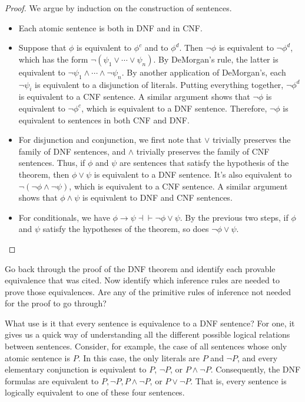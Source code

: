 \begin{proof} We argue by induction on the construction of sentences.
\begin{itemize}
\item Each atomic sentence is both in DNF and in CNF.
\item Suppose that $\phi$ is equivalent to $\phi ^c$ and to $\phi ^d$.
  Then $\neg \phi$ is equivalent to $\neg \phi ^d$, which has the form
  $\neg (\psi _1\vee\cdots\vee\psi _n)$.  By DeMorgan's rule, the
  latter is equivalent to
  $\neg \psi _1\wedge \cdots \wedge\neg \psi _n$.  By another
  application of DeMorgan's, each $\neg \psi _i$ is equivalent to a
  disjunction of literals.  Putting everything together,
  $\neg \phi ^d$ is equivalent to a CNF sentence.  A similar argument
  shows that $\neg \phi$ is equivalent to $\neg \phi ^c$, which is
  equivalent to a DNF sentence.  Therefore, $\neg \phi$ is equivalent
  to sentences in both CNF and DNF.
\item For disjunction and conjunction, we first note that $\vee$
  trivially preserves the family of DNF sentences, and $\wedge$
  trivially preserves the family of CNF sentences.  Thus, if $\phi$
  and $\psi$ are sentences that satisfy the hypothesis of the theorem,
  then $\phi\vee\psi$ is equivalent to a DNF sentence.  It's also
  equivalent to $\neg (\neg \phi\wedge\neg\psi )$, which is equivalent
  to a CNF sentence.  A similar argument shows that $\phi\wedge\psi$
  is equivalent to DNF and CNF sentences.
\item For conditionals, we have
  $\phi\to\psi\dashv\vdash\neg \phi\vee\psi$.  By the previous two
  steps, if $\phi$ and $\psi$ satisfy the hypotheses of the theorem,
  so does $\neg\phi\vee\psi$.
\end{itemize} \end{proof}

\begin{exercise} Go back through the proof of the DNF theorem and
  identify each provable equivalence that was cited.  Now identify
  which inference rules are needed to prove those equivalences.  Are
  any of the primitive rules of inference not needed for the proof to
  go through? \end{exercise}

What use is it that every sentence is equivalence to a DNF sentence?
For one, it gives us a quick way of understanding all the different
possible logical relations between sentences.  Consider, for example,
the case of all sentences whose only atomic sentence is $P$.  In this
case, the only literals are $P$ and $\neg P$, and every elementary
conjunction is equivalent to $P$, $\neg P$, or $P\wedge\neg P$.
Consequently, the DNF formulas are equivalent to
$P,\neg P,P\wedge\neg P$, or $P\vee\neg P$.  That is, every sentence
is logically equivalent to one of these four sentences.  

